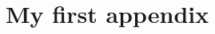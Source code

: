 \documentclass[12pt,a4paper,footinclude=true,twoside,headinclude=true]{report}
\begin{document}




\appendix 
{}

\listoffigures
\listoftables

\chapter{My first appendix}\label{sec:appendix1}
\end{document}
